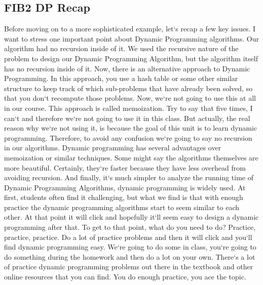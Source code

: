 \subsection{FIB2  DP Recap}
Before moving on to a more sophisticated example, let`s recap a few key issues.
I want to stress one important point about Dynamic Programming algorithms.
Our algorithm had no recursion inside of it.
We used the recursive nature of the problem to design our Dynamic Programming Algorithm, but the algorithm itself has no recursion inside of it.
Now, there is an alternative approach to Dynamic Programming.
In this approach, you use a hash table or some other similar structure to keep track of which sub-problems that have already been solved, so that you don`t recompute those problems.
Now, we`re not going to use this at all in our course.
This approach is called memoization.
Try to say that five times, I can`t and therefore we`re not going to use it in this class.
But actually, the real reason why we`re not using it, is because the goal of this unit is to learn dynamic programming.
Therefore, to avoid any confusion we`re going to say no recursion in our algorithms.
Dynamic programming has several advantages over memoization or similar techniques.
Some might say the algorithms themselves are more beautiful.
Certainly, they`re faster because they have less overhead from avoiding recursion.
And finally, it`s much simpler to analyze the running time of Dynamic Programming Algorithms, dynamic programming is widely used.
At first, students often find it challenging, but what we find is that with enough practice the dynamic programming algorithms start to seem similar to each other.
At that point it will click and hopefully it`ll seem easy to design a dynamic programming after that.
To get to that point, what do you need to do? Practice, practice, practice.
Do a lot of practice problems and then it will click and you`ll find dynamic programming easy.
We`re going to do some in class, you`re going to do something during the homework and then do a lot on your own.
There`s a lot of practice dynamic programming problems out there in the textbook and other online resources that you can find.
You do enough practice, you ace the topic.

